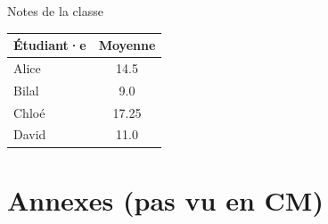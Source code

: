 \documentclass{beamer}
\begin{document}

\begin{frame}{Notes de la classe}
	\begin{center}
		\renewcommand{\arraystretch}{1.3}
		\begin{tabular}{lc}
			Étudiant·e & Moyenne \\ \hline
			Alice & 14.5 \\
			Bilal & 9.0 \\
			Chloé & 17.25 \\
			David & 11.0 \\
		\end{tabular}
	\end{center}
\end{frame}

\fi %

\section{Annexes (pas vu en CM)}
\end{document}
